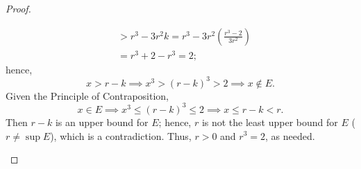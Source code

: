 \documentclass[12pt]{article}
\theoremstyle{definition}
\begin{document}
\begin{proof}
\begin{enumerate}[label=(\alph*)]
\begin{align*}
            &> r^3 - 3r^2k = r^3 - 3r^2\left(\frac{r^3 - 2}{3r^2}\right) \\
            &= r^3 + 2 - r^3 = 2;
        \end{align*}
        hence,
        \[
            x > r - k \implies x^3 > (r - k)^3 > 2 \implies x \notin E.
        \]
        Given the Principle of Contraposition,
        \[
            x \in E \implies x^3 \leq (r - k)^3 \leq 2 \implies x \leq r - k < r.
        \]
        Then $r - k$ is an upper bound for $E$; hence, $r$ is not the least upper bound for $E$ ($r \neq \sup E$), which is a contradiction. Thus, $r > 0$ and $r^3 = 2$, as needed. 
    \end{enumerate}
\end{proof}
\end{document}
